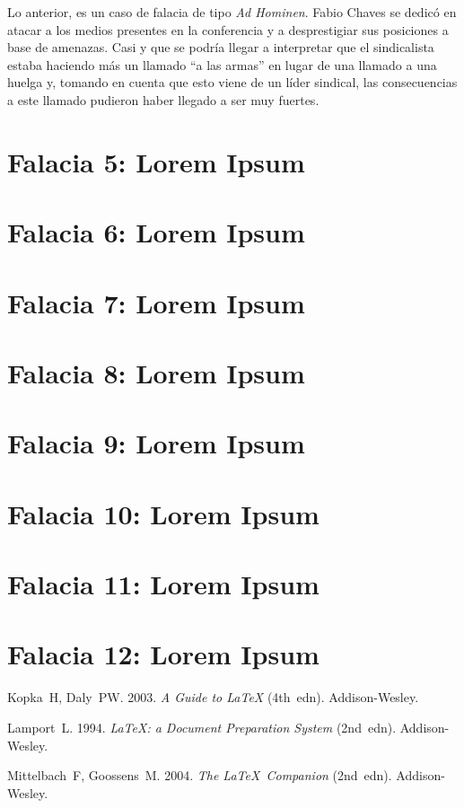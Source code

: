 \documentclass[times]{simauth}
\begin{document}
Lo anterior, es un caso de falacia de tipo \textit{Ad Hominen}. Fabio Chaves se dedicó en atacar a los medios presentes en la conferencia y a desprestigiar sus posiciones a base de amenazas. Casi y que se podría llegar a interpretar que el sindicalista estaba haciendo más un llamado ``a las armas'' en lugar de una  llamado a una huelga y, tomando en cuenta que esto viene de un líder sindical, las consecuencias a este llamado pudieron haber llegado a ser muy fuertes. 

\section{Falacia 5: Lorem Ipsum}

\section{Falacia 6: Lorem Ipsum}

\section{Falacia 7: Lorem Ipsum}

\section{Falacia 8: Lorem Ipsum}

\section{Falacia 9: Lorem Ipsum}

\section{Falacia 10: Lorem Ipsum}

\section{Falacia 11: Lorem Ipsum}

\section{Falacia 12: Lorem Ipsum}


\begin{thebibliography}{9}

 Kopka~H, Daly~PW. 2003. \emph{A Guide to \LaTeX} (4th~edn).
Addison-Wesley.

 Lamport~L. 1994. \emph{\LaTeX: a Document Preparation System} (2nd~edn).
Addison-Wesley.

 Mittelbach~F, Goossens~M. 2004. \emph{The \LaTeX\ Companion}
(2nd~edn). Addison-Wesley.
\end{thebibliography}
\end{document}
